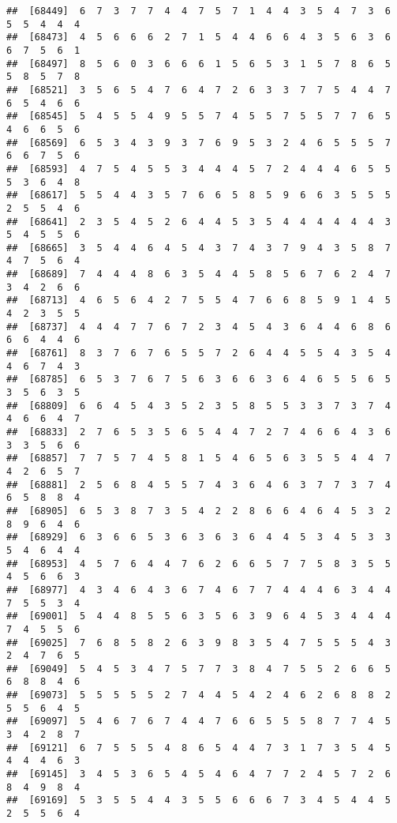\documentclass[
]{book}
\begin{document}
\begin{verbatim}
##  [68449]  6  7  3  7  7  4  4  7  5  7  1  4  4  3  5  4  7  3  6  5  5  4  4  4
##  [68473]  4  5  6  6  6  2  7  1  5  4  4  6  6  4  3  5  6  3  6  6  7  5  6  1
##  [68497]  8  5  6  0  3  6  6  6  1  5  6  5  3  1  5  7  8  6  5  5  8  5  7  8
##  [68521]  3  5  6  5  4  7  6  4  7  2  6  3  3  7  7  5  4  4  7  6  5  4  6  6
##  [68545]  5  4  5  5  4  9  5  5  7  4  5  5  7  5  5  7  7  6  5  4  6  6  5  6
##  [68569]  6  5  3  4  3  9  3  7  6  9  5  3  2  4  6  5  5  5  7  6  6  7  5  6
##  [68593]  4  7  5  4  5  5  3  4  4  4  5  7  2  4  4  4  6  5  5  5  3  6  4  8
##  [68617]  5  5  4  4  3  5  7  6  6  5  8  5  9  6  6  3  5  5  5  2  5  5  4  6
##  [68641]  2  3  5  4  5  2  6  4  4  5  3  5  4  4  4  4  4  4  3  5  4  5  5  6
##  [68665]  3  5  4  4  6  4  5  4  3  7  4  3  7  9  4  3  5  8  7  4  7  5  6  4
##  [68689]  7  4  4  4  8  6  3  5  4  4  5  8  5  6  7  6  2  4  7  3  4  2  6  6
##  [68713]  4  6  5  6  4  2  7  5  5  4  7  6  6  8  5  9  1  4  5  4  2  3  5  5
##  [68737]  4  4  4  7  7  6  7  2  3  4  5  4  3  6  4  4  6  8  6  6  6  4  4  6
##  [68761]  8  3  7  6  7  6  5  5  7  2  6  4  4  5  5  4  3  5  4  4  6  7  4  3
##  [68785]  6  5  3  7  6  7  5  6  3  6  6  3  6  4  6  5  5  6  5  3  5  6  3  5
##  [68809]  6  6  4  5  4  3  5  2  3  5  8  5  5  3  3  7  3  7  4  4  6  6  4  7
##  [68833]  2  7  6  5  3  5  6  5  4  4  7  2  7  4  6  6  4  3  6  3  3  5  6  6
##  [68857]  7  7  5  7  4  5  8  1  5  4  6  5  6  3  5  5  4  4  7  4  2  6  5  7
##  [68881]  2  5  6  8  4  5  5  7  4  3  6  4  6  3  7  7  3  7  4  6  5  8  8  4
##  [68905]  6  5  3  8  7  3  5  4  2  2  8  6  6  4  6  4  5  3  2  8  9  6  4  6
##  [68929]  6  3  6  6  5  3  6  3  6  3  6  4  4  5  3  4  5  3  3  5  4  6  4  4
##  [68953]  4  5  7  6  4  4  7  6  2  6  6  5  7  7  5  8  3  5  5  4  5  6  6  3
##  [68977]  4  3  4  6  4  3  6  7  4  6  7  7  4  4  4  6  3  4  4  7  5  5  3  4
##  [69001]  5  4  4  8  5  5  6  3  5  6  3  9  6  4  5  3  4  4  4  7  4  5  5  6
##  [69025]  7  6  8  5  8  2  6  3  9  8  3  5  4  7  5  5  5  4  3  2  4  7  6  5
##  [69049]  5  4  5  3  4  7  5  7  7  3  8  4  7  5  5  2  6  6  5  6  8  8  4  6
##  [69073]  5  5  5  5  5  2  7  4  4  5  4  2  4  6  2  6  8  8  2  5  5  6  4  5
##  [69097]  5  4  6  7  6  7  4  4  7  6  6  5  5  5  8  7  7  4  5  3  4  2  8  7
##  [69121]  6  7  5  5  5  4  8  6  5  4  4  7  3  1  7  3  5  4  5  4  4  4  6  3
##  [69145]  3  4  5  3  6  5  4  5  4  6  4  7  7  2  4  5  7  2  6  8  4  9  8  4
##  [69169]  5  3  5  5  4  4  3  5  5  6  6  6  7  3  4  5  4  4  5  2  5  5  6  4

\end{verbatim}
\end{document}
